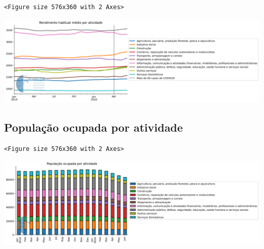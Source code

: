 \documentclass[11pt]{article}
\begin{document}
\begin{verbatim}
<Figure size 576x360 with 2 Axes>
\end{verbatim}


\begin{center}
\includegraphics[width=.9\linewidth]{obipy-resources/62e383af79e91b63c7fc98dd7fb55b3c3ececcb9/3d8842369ae72eae4769d15d2505555845230e71.png}
\end{center}

\subsection{População ocupada por atividade}
\label{sec:org4af8cc7}

\begin{verbatim}
<Figure size 576x360 with 2 Axes>
\end{verbatim}


\begin{center}
\includegraphics[width=.9\linewidth]{obipy-resources/62e383af79e91b63c7fc98dd7fb55b3c3ececcb9/18ae86fa0395bd8722bf758ae72aaa47ff7d9d15.png}
\end{center}
\end{document}

